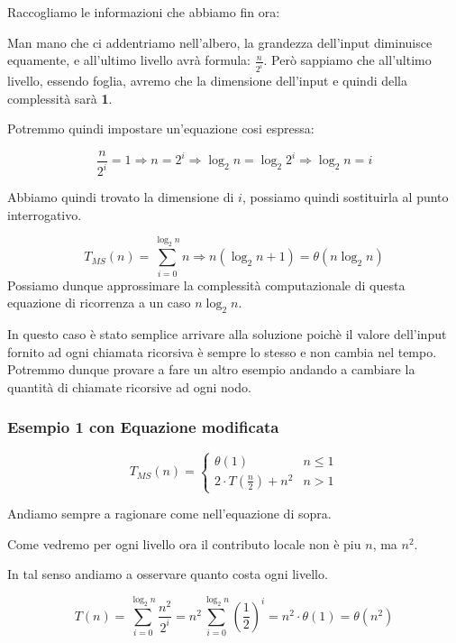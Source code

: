 Raccogliamo le informazioni che abbiamo fin ora:


Man mano che ci addentriamo nell'albero, la grandezza dell'input diminuisce equamente, e all'ultimo livello avrà formula: $\frac{n}{2^i}$. Però sappiamo che all'ultimo livello, essendo foglia, avremo che la dimensione dell'input e quindi della complessità sarà \textbf{1}.\smallskip

Potremmo quindi impostare un'equazione cosi espressa:

$$\frac{n}{2^i} = 1 \Rightarrow n = 2^i \Rightarrow \log_2 n = \log_2 2^i \Rightarrow \log_2 n = i$$\smallskip

Abbiamo quindi trovato la dimensione di $i$, possiamo quindi sostituirla al punto interrogativo. 

$$ T_{MS}(n)=\sum_{i=0}^{\log_2 n} n \Rightarrow n(\log_2 n+1) = \theta(n\log_2 n)$$
Possiamo dunque approssimare la complessità computazionale di questa equazione di ricorrenza a un caso $n\log_2 n$. 
\smallskip

In questo caso è stato semplice arrivare alla soluzione poichè il valore dell'input fornito ad ogni chiamata ricorsiva è sempre lo stesso e non cambia nel tempo. Potremmo dunque provare a fare un altro esempio andando a cambiare la quantità di chiamate ricorsive ad ogni nodo.

\smallskip

\subsubsection{Esempio 1 con Equazione modificata}

$$T_{MS}(n)= \left\{ \begin{array}{rcl}
    \theta(1) &  n\le1\\
    2 \cdot T(\frac{n}{2})+n^2 & n>1
    \end{array}\right.$$
\smallskip

Andiamo sempre a ragionare come nell'equazione di sopra.


Come vedremo per ogni livello ora il contributo locale non è piu $n$, ma $n^2$.

In tal senso andiamo a osservare quanto costa ogni livello.


$$T(n) = \sum_{i=0}^{\log_2 n} \frac{n^2}{2^i} = n^2\sum_{i=0}^{\log_2 n} (\frac{1}{2})^i = n^2 \cdot \theta(1) = \theta(n^2)$$

